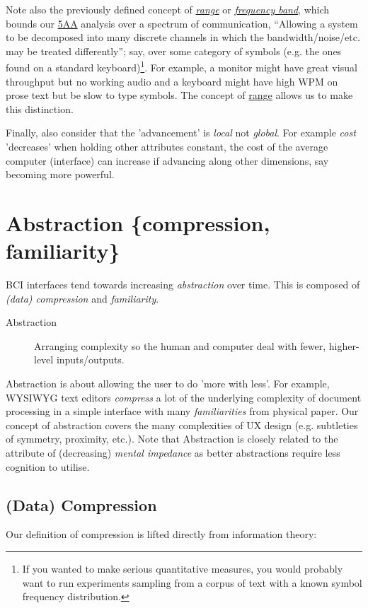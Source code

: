 \documentclass[logo,bsc,singlespacing,parskip]{infthesis}
\begin{document}
Note also the previously defined concept of \emph{\hyperref[range]{range}} or \emph{\hyperref[org04e38cf]{frequency band}}, which bounds our \hyperref[org2644eb5]{5AA} analysis over a spectrum of communication, ``Allowing a system to be decomposed into many discrete channels in which the bandwidth/noise/etc. may be treated differently''; say, over some category of symbols (e.g. the ones found on a standard keyboard)\footnote{If you wanted to make serious quantitative measures, you would probably want to run experiments sampling from a corpus of text with a known symbol frequency distribution.}.
For example, a monitor might have great visual throughput but no working audio and a keyboard might have high WPM on prose text but be slow to type symbols.
The concept of \hyperref[range]{range} allows us to make this distinction.

Finally, also consider that the 'advancement' is \emph{local} not \emph{global}.
For example \emph{cost} 'decreases' when holding other attributes constant, the cost of the average computer (interface) can increase if advancing along other dimensions, say becoming more powerful.
\section{Abstraction \{compression, familiarity\}}
\label{sec:org6152909}
BCI interfaces tend towards increasing \emph{abstraction} over time.
This is composed of \emph{(data) compression} and \emph{familiarity}.

\begin{mdframed}
\begin{description}
\item[{Abstraction\label{abstraction}}] Arranging complexity so the human and computer deal with fewer, higher-level inputs/outputs.
\end{description}
\end{mdframed}

Abstraction is about allowing the user to do 'more with less'.
For example, WYSIWYG text editors \emph{compress} a lot of the underlying complexity of document processing in a simple interface with many \emph{familiarities} from physical paper.
Our concept of abstraction covers the many complexities of UX design (e.g. subtleties of symmetry, proximity, etc.).
Note that Abstraction is closely related to the attribute of (decreasing) \emph{mental impedance} as better abstractions require less cognition to utilise.
\subsection{(Data) Compression}
\label{sec:orge2035bf}
Our definition of compression is lifted directly from information theory:
\end{document}
